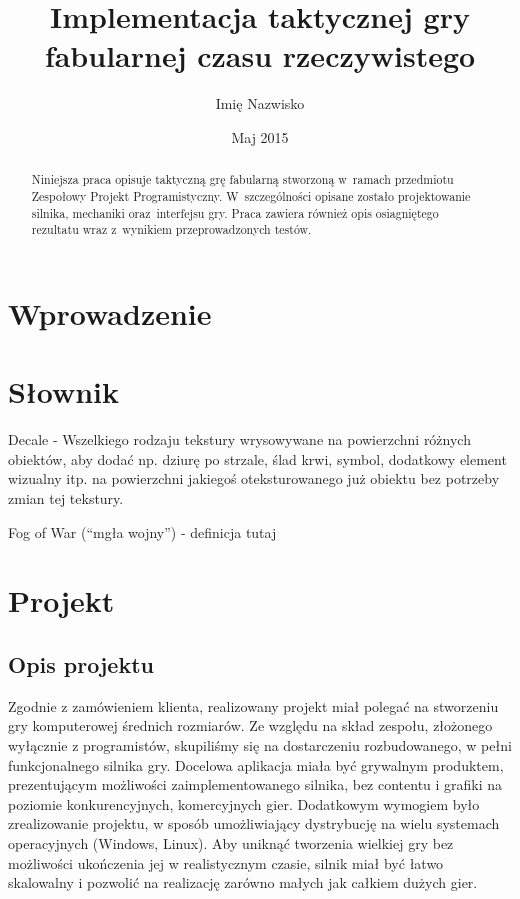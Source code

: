 \documentclass[licencjacka]{pracamgr}
\author	{Imię Nazwisko}
\title{Implementacja taktycznej gry fabularnej czasu rzeczywistego}
\date{Maj 2015}
\begin{document}
\maketitle

\begin{abstract}
  Niniejsza praca opisuje taktyczną grę fabularną stworzoną
  w~ramach przedmiotu Zespołowy Projekt Programistyczny.
  W~szczególności opisane zostało projektowanie silnika,
  mechaniki oraz~interfejsu gry. Praca zawiera również
  opis osiagniętego rezultatu wraz z~wynikiem przeprowadzonych testów.
\end{abstract}

\tableofcontents

\chapter*{Wprowadzenie}


\chapter{Słownik}
  Decale - Wszelkiego rodzaju tekstury wrysowywane na powierzchni różnych obiektów, aby dodać np. dziurę po strzale,
  ślad krwi, symbol, dodatkowy element wizualny itp. na powierzchni jakiegoś oteksturowanego już obiektu bez potrzeby
  zmian tej tekstury.

  Fog of War (``mgła wojny'') - definicja tutaj

\chapter{Projekt}

  \section{Opis projektu}
  Zgodnie z zamówieniem klienta, realizowany projekt miał polegać na stworzeniu gry komputerowej
  średnich rozmiarów. Ze względu na skład zespołu, złożonego wyłącznie z programistów, skupiliśmy się
  na dostarczeniu rozbudowanego, w pełni funkcjonalnego silnika gry.
  Docelowa aplikacja miała być grywalnym produktem, prezentującym możliwości zaimplementowanego silnika,
  bez contentu i grafiki na poziomie konkurencyjnych, komercyjnych gier. Dodatkowym wymogiem było zrealizowanie
  projektu, w sposób umożliwiający dystrybucję na wielu systemach operacyjnych (Windows, Linux). Aby uniknąć
  tworzenia wielkiej gry bez możliwości ukończenia jej w realistycznym czasie, silnik miał być łatwo skalowalny
  i pozwolić na realizację zarówno małych jak całkiem dużych gier.
\end{document}
